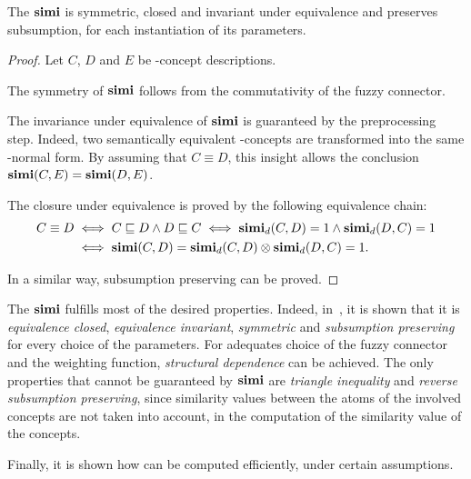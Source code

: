   \begin{theorem}
    The \csm \(\mathbf{simi}\) is symmetric, closed and invariant under equivalence and preserves subsumption, for each instantiation of its parameters.
  \end{theorem}
  \begin{proof}
    Let \(C\), \(D\) and \(E\) be \elh-concept descriptions.

    The symmetry of \(\mathbf{simi}\) follows from the commutativity of the fuzzy connector.

    The invariance under equivalence of \(\mathbf{simi}\) is guaranteed by the preprocessing step.
    Indeed, two semantically equivalent \elh-concepts are transformed into the same \elh-normal form.
    By assuming that \(C \equiv D\), this insight allows the conclusion \(\mathbf{simi}(C,E) = \mathbf{simi}(D,E)\).

    The closure under equivalence is proved by the following equivalence chain:
    \begin{equation*}
      \begin{split}
        C \equiv D &\iff C \sqsubseteq D \land D \sqsubseteq C \iff
        \mathbf{simi}_d(C,D) = 1 \land \mathbf{simi}_d(D,C) = 1 \\ &\iff
        \mathbf{simi}(C,D) = \mathbf{simi}_d(C,D) \otimes \mathbf{simi}_d(D,C) = 1.
      \end{split}
    \end{equation*}

    In a similar way, subsumption preserving can be proved.
  \end{proof}
  The \csm \(\mathbf{simi}\) fulfills most of the desired properties.
  Indeed, in~\cite{LeTu12}, it is shown that it is \emph{equivalence closed}, \emph{equivalence invariant}, \emph{symmetric} and \emph{subsumption preserving} for every choice of the parameters.
  For adequates choice of the fuzzy connector and the weighting function, \emph{structural dependence} can be achieved.
  The only properties that cannot be guaranteed by \(\mathbf{simi}\) are \emph{triangle inequality} and \emph{reverse subsumption preserving}, since similarity values between the atoms of the involved concepts are not taken into account, in the computation of the similarity value of the concepts.

  Finally, it is shown how \simi can be computed efficiently, under certain assumptions.

